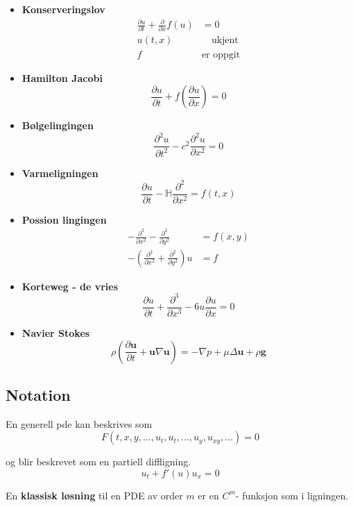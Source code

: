 \documentclass{article}
\theoremstyle{remark}
\begin{document}
  \begin{itemize}
    \item
 \textbf{Konserveringslov}  \[
   \begin{split}
     \frac{\partial u}{\partial t} + \frac{\partial }{\partial x} f\left( u \right) &= 0\\
     u\left( t,x \right)  &  \quad \text{ukjent}  \\
     f \quad  & \text{er oppgit} 
   \end{split}
 \] 
 \item
 \textbf{Hamilton Jacobi} \[
 \frac{\partial u}{\partial t}  +  f \left( \frac{\partial u}{\partial x} \right)  = 0
 \] 
 \item \textbf{Bølgelingingen}  \[
 \frac{\partial ^{2} u }{\partial t^{2}} - c^2 \frac{\partial ^2u}{\partial x^2}  = 0
 \] 
 \item \textbf{Varmeligningen} \[
 \frac{\partial u}{\partial t} - \mathbb{H} \frac{\partial ^2}{\partial x^2}  = f\left( t,x \right) 
 \] 
 \item  \textbf{Possion lingingen} \[
     \begin{split}
 - \frac{\partial ^2}{\partial x^2}  - \frac{\partial ^2}{\partial y^2}   & = f\left( x,y \right) \\
 -\left( \frac{\partial ^2}{\partial x^2}  + \frac{\partial ^2}{\partial y^2}  \right)u &= f 
     \end{split}
 \] 
 \item \textbf{Korteweg - de vries} \[
 \frac{\partial u}{\partial t}  + \frac{\partial ^{3}}{\partial x^{3}}  - 6u \frac{\partial u}{\partial x} = 0
 \]  
 \item \textbf{Navier Stokes} \[
 \rho \left( \frac{\partial \mathbf{u}}{\partial t}  + \mathbf{u} \nabla \mathbf{u} \right) = - \nabla p + \mu \Delta \mathbf{u} + \rho \mathbf{g} 
 \] 

  \end{itemize}

  \subsection{Notation}%
  \label{sub:notation}

  En generell pde kan beskrives som \[
  F\left( t, x, y, \ldots, u_{t}, u_{t} , \ldots , u_{y} , u_{xy}, \ldots  \right) = 0
  \] 

  og blir beskrevet som en partiell diffligning. \[
  u_{t} + f'\left( u \right) u_{x} = 0
  \] 

  En \textbf{klassisk løsning }  til en PDE av order $m$ er en $C^{m}$- funksjon som i ligningen. 
\end{document}

